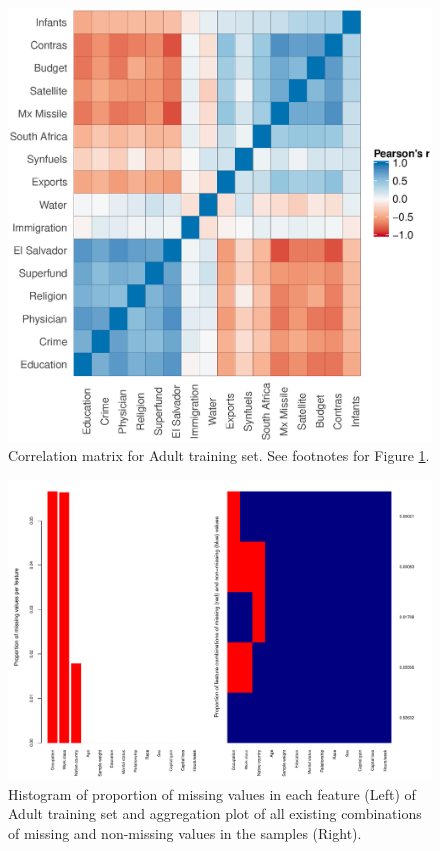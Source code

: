 \documentclass[10pt]{book}
\theoremstyle{definition}
\begin{document}
\begin{figure}[h!]
\includegraphics [scale=0.75, center]{figure/correlation-votes}\par
\caption{\footnotesize Correlation matrix for Adult training set. See footnotes for Figure \ref{fig:correlation-adult}.}
 \label{fig:correlation-adult}
\end{figure}

\begin{figure}[h!]
\includegraphics [scale=0.75, center]{figure/proportion-missing-adult}\par
\caption{\footnotesize Histogram of proportion of missing values in each feature (Left) of Adult training set and aggregation plot of all existing combinations of missing and non-missing values in the samples (Right).}
 \label{fig:proportion-missing-adult}
\end{figure}
\end{document}

